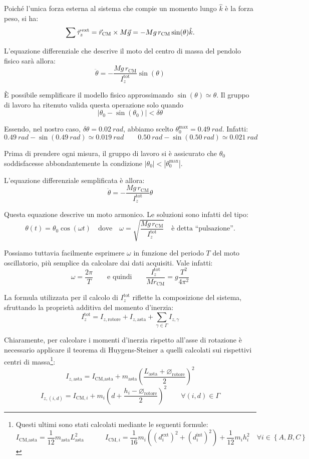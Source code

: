 \documentclass{article}
\newcommand*{\diam}{\varnothing}
\begin{document}
Poiché l'unica forza esterna al sistema che compie un momento lungo
$\hat{k}$ è la forza peso, si ha:
\[
  \sum\vec{\tau}^\text{\,ext}_z =
  \vec{r}_\text{CM}\times M\vec{g} = -Mg\,r_\text{CM}\sin(\theta)\hat{k}.
\]

L'equazione differenziale che descrive il moto del centro di massa
del pendolo fisico sarà allora:
\[ \ddot{\theta} = -\frac{Mg\,r_\text{CM}}{I_z^\text{tot}}\sin(\theta) \]

È possibile semplificare il modello fisico approssimando
$\sin(\theta)\simeq\theta$. Il gruppo di lavoro ha ritenuto
valida questa operazione solo quando
\[\left|\theta_0-\sin(\theta_0)\right| < \delta\theta\]

Essendo, nel nostro caso, $\delta\theta=\qty{0.02}{rad}$, abbiamo scelto
$\theta_0^\text{max} = \qty{0.49}{rad}$. Infatti:
\[
  \qty{0.49}{rad} - \sin(\qty{0.49}{rad}) \simeq \qty{0.019}{rad}
  \qquad
  \qty{0.50}{rad} - \sin(\qty{0.50}{rad}) \simeq \qty{0.021}{rad}
\]

Prima di prendere ogni misura, il gruppo di lavoro si è assicurato
che $\theta_0$ soddisfacesse abbondantemente la condizione
$|\theta_0|<\left|\theta_0^\text{max}\right|$.

L'equazione differenziale semplificata è allora:
\[ \ddot{\theta} = -\frac{Mg\,r_\text{CM}}{I_z^\text{tot}} \theta \]

Questa equazione descrive un moto armonico. Le soluzioni sono infatti
del tipo:
\[
  \theta(t) = \theta_0\cos(\omega t)
  \quad\text{dove}\quad
  \omega = \sqrt{\frac{Mg\,r_\text{CM}}{I_z^\text{tot}}}\quad\text{è detta “pulsazione”}.
\]

Possiamo tuttavia facilmente esprimere $\omega$ in funzione del periodo
$T$ del moto oscillatorio, più semplice da calcolare dai dati acquisiti.
Vale infatti:
\[
  \omega = \frac{2\pi}{T}
  \qquad\text{e quindi}\qquad
  \frac{I_z^\text{tot}}{Mr_\text{CM}} = g \frac{T^2}{4\pi^2}
\]

La formula utilizzata per il calcolo di $I_z^\text{tot}$ riflette la composizione
del sistema, sfruttando la proprietà additiva del momento d'inerzia:
\[I_z^\text{tot} = I_{z,\text{rotore}} + I_{z,\text{asta}} + \sum_{\gamma\in\Gamma} I_{z,\gamma}\]

Chiaramente, per calcolare i momenti d'inerzia rispetto all'asse di
rotazione è necessario applicare il teorema di Huygens-Steiner
a quelli calcolati sui rispettivi centri di massa\footnote{
  Questi ultimi sono stati calcolati mediante le seguenti formule:
  \[
    I_\text{CM,asta} = \frac{1}{12} m_\text{asta} L_\text{asta}^2
    \qquad\quad
    I_{\text{CM},i} =
      \frac{1}{16}m_i\left(
        (d_i^\text{ext})^2 +
        (d_i^\text{int})^2
      \right) + \frac{1}{12} m_i h_i^2
    \quad\forall i \in \left\{A,B,C\right\}
  \]
}:
\[
  I_{z,\text{asta}} = I_\text{CM,asta} + m_\text{asta}\left(\frac{L_\text{asta} + \diam_\text{rotore}}{2}\right)^2
\]\[
  I_{z,(i,d)} = I_{\text{CM},i} + m_i\left(d + \frac{h_i - \diam_\text{rotore}}{2}\right)^2\qquad\forall(i,d)\in\Gamma
\]
\end{document}
